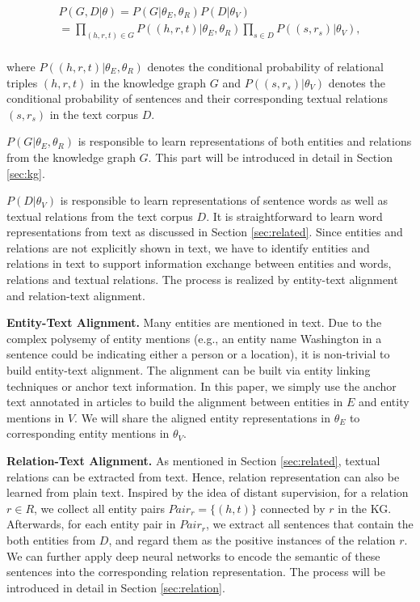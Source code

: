 \documentclass[11pt,a4paper]{article}
\begin{document}
\begin{align}
\label{eq:topeq}
P(G,D|{\theta}) = P(G|{\theta_E,\theta_R})P(D|{\theta_V}) \\\nonumber
= \prod_{(h,r,t) \in G}P((h, r, t)|{\theta_E, \theta_R}) \prod_{s \in D}P((s, r_s)|{\theta_V}), \\\nonumber
\end{align}

where $P((h, r, t)|{\theta_E,\theta_R})$ denotes the conditional probability of relational triples $(h, r, t)$ in the knowledge graph $G$ and $P((s, r_s)|{\theta_V})$ denotes the conditional probability of sentences and their corresponding textual relations $(s, r_s)$ in the text corpus $D$.

$P(G|\theta_E, \theta_R)$ is responsible to learn representations of both entities and relations from the knowledge graph $G$. This part will be introduced in detail in Section \ref{sec:kg}.

$P(D|{\theta_V})$ is responsible to learn representations of sentence words as well as textual relations from the text corpus $D$. It is straightforward to learn word representations from text as discussed in Section \ref{sec:related}. Since entities and relations are not explicitly shown in text, we have to identify entities and relations in text to support information exchange between entities and words, relations and textual relations. The process is realized by entity-text alignment and relation-text alignment.

\textbf{Entity-Text Alignment.} Many entities are mentioned in text. Due to the complex polysemy of entity mentions (e.g., an entity name Washington in a sentence could be indicating either a person or a location), it is non-trivial to build entity-text alignment. The alignment can be built via entity linking techniques or anchor text information. In this paper, we simply use the anchor text annotated in articles to build the alignment between entities in $E$ and entity mentions in $V$. We will share the aligned entity representations in $\theta_E$ to corresponding entity mentions in $\theta_V$.

\textbf{Relation-Text Alignment.} As mentioned in Section \ref{sec:related}, textual relations can be extracted from text. Hence, relation representation can also be learned from plain text. Inspired by the idea of distant supervision, for a relation $r \in R$, we collect all entity pairs $Pair_{r} = \{(h, t)\}$ connected by $r$ in the KG. Afterwards, for each entity pair in $Pair_{r}$, we extract all sentences that contain the both entities from $D$, and regard them as the positive instances of the relation $r$. We can further apply deep neural networks to encode the semantic of these sentences into the corresponding relation representation. The process will be introduced in detail in Section \ref{sec:relation}.
\end{document}

